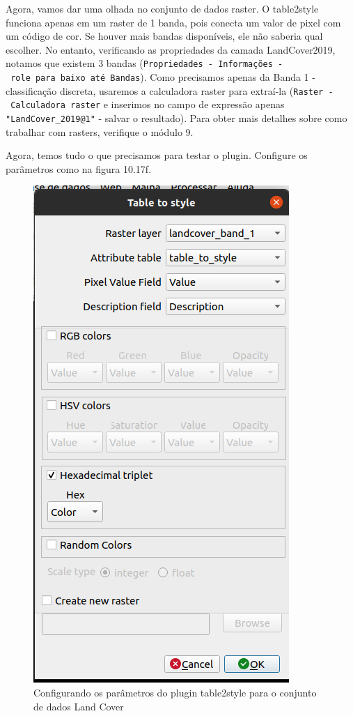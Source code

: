 \documentclass[
]{krantz}
\begin{document}
Agora, vamos dar uma olhada no conjunto de dados raster. O table2style funciona apenas em um raster de 1 banda, pois conecta um valor de pixel com um código de cor. Se houver mais bandas disponíveis, ele não saberia qual escolher. No entanto, verificando as propriedades da camada LandCover2019, notamos que existem 3 bandas (\texttt{Propriedades\ -\ Informações\ -\ role\ para\ baixo\ até\ Bandas}). Como precisamos apenas da Banda 1 - classificação discreta, usaremos a calculadora raster para extraí-la (\texttt{Raster\ -\ Calculadora\ raster} e inserimos no campo de expressão apenas \texttt{"LandCover\_2019@1"} - salvar o resultado). Para obter mais detalhes sobre como trabalhar com rasters, verifique o módulo 9.

Agora, temos tudo o que precisamos para testar o plugin. Configure os parâmetros como na figura 10.17f.

\begin{figure}
\centering
\includegraphics{media/modulo10/fig1017_f.png}
\caption{Configurando os parâmetros do plugin table2style para o conjunto de dados Land Cover}
\end{figure}
\end{document}
